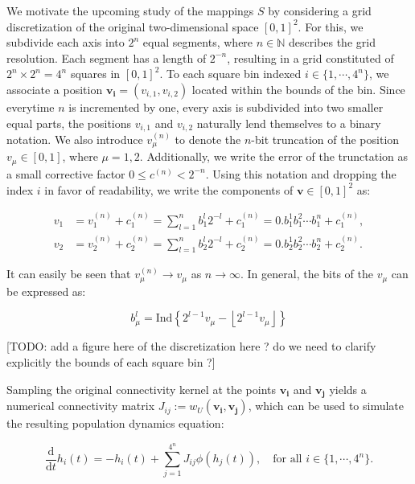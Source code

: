 \documentclass[NETN,manuscript]{stjour-new}
\def\d{\mathrm d}
\renewcommand{\vec}[1]{\boldsymbol{#1}}
\begin{document}
We motivate the upcoming study of the mappings $S$ by considering a grid discretization of the original two-dimensional space $[0,1]^2$. For this, we subdivide each axis into $2^n$ equal segments, where $n \in \mathbb{N}$ describes the grid resolution. Each segment has a length of $2^{-n}$, resulting in a grid constituted of $2^n \times 2^n = 4^n$ squares in $[0,1]^2$. To each square bin indexed $i \in \{1,\cdots,4^n\}$, we associate a position $\vec{v_i} = (v_{i,1}, v_{i,2})$ located within the bounds of the bin. Since everytime $n$ is incremented by one, every axis is subdivided into two smaller equal parts, the positions $v_{i,1}$ and $v_{i,2}$ naturally lend themselves to a binary notation. We also introduce $v_\mu^{(n)}$ to denote the $n$-bit truncation of the position $v_\mu \in [0,1]$, where $\mu = 1,2$. Additionally, we write the error of the trunctation as a small corrective factor $0 \leq c^{(n)} < 2^{-n}$. Using this notation and dropping the index $i$ in favor of readability, we write the components of $\vec{v} \in [0,1]^2$ as:

\begin{equation} \begin{aligned} \label{eq:positions-v}
v_1 &= v_1^{(n)} + c_1^{(n)} = \sum_{l=1}^n b_1^l 2^{-l} + c_1^{(n)} = 0.b_1^1 b_1^2 \cdots b_1^n + c_1^{(n)}, \\
v_2 &= v_2^{(n)} + c_2^{(n)} = \sum_{l=1}^n b_2^l 2^{-l} + c_2^{(n)} = 0.b_2^1 b_2^2 \cdots b_2^n + c_2^{(n)}.
\end{aligned}\end{equation}

It can easily be seen that $v_\mu^{(n)} \to v_\mu$ as $n\to\infty$. In general, the bits of the $v_\mu$ can be expressed as:

\begin{equation*}
b_\mu^l = \mathrm{Ind} \left\{ 2^{l-1}v_\mu - \left\lfloor 2^{l-1}v_\mu \right\rfloor \right\}
\end{equation*}

[TODO: add a figure here of the discretization here ? do we need to clarify explicitly the bounds of each square bin ?]

Sampling the original connectivity kernel at the points $\vec{v_i}$ and $\vec{v_j}$ yields a numerical connectivity matrix $J_{ij} := w_U(\vec{v_i}, \vec{v_j})$, which can be used to simulate the resulting population dynamics equation:

\begin{equation} \label{eq:population-dynamics}
\frac{\d}{\d t} h_i(t) = -h_i(t) + \sum_{j=1}^{4^n} J_{ij} \phi(h_j(t)), \quad \text{for all } i \in \{1,\cdots,4^n\}.
\end{equation}
\end{document}
